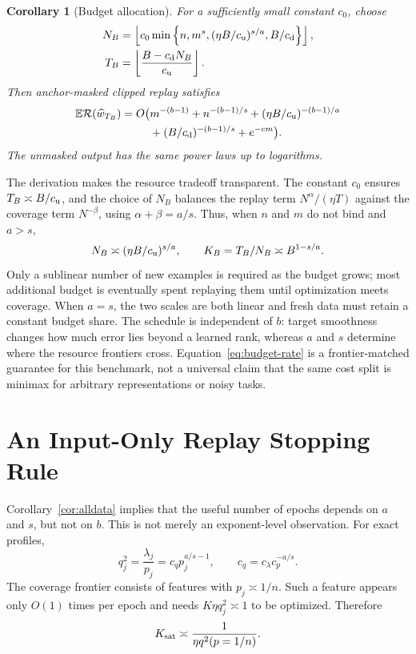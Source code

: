 \documentclass[letterpaper]{article}
\newtheorem{corollary}[theorem]{Corollary}
\newcommand{\E}{\mathbb E}
\newcommand{\R}{\mathcal R}
\begin{document}
\begin{corollary}[Budget allocation]
\label{cor:budget}
For a sufficiently small constant $c_0$, choose
\begin{align}
N_B&=\left\lfloor c_0\min\left\{
 n,m^s,(\eta B/c_{\rm u})^{s/a},B/c_{\rm d}
 \right\}\right\rfloor,\nonumber\\
T_B&=\left\lfloor\frac{B-c_{\rm d}N_B}{c_{\rm u}}\right\rfloor.
\label{eq:budget-schedule}
\end{align}
Then anchor-masked clipped replay satisfies
\begin{align}
\E\R(\widehat w_{T_B})=O\bigl(&m^{-(b-1)}+n^{-(b-1)/s}
 +(\eta B/c_{\rm u})^{-(b-1)/a}\nonumber\\
&+(B/c_{\rm d})^{-(b-1)/s}+e^{-cm}\bigr).
\label{eq:budget-rate}
\end{align}
The unmasked output has the same power laws up to logarithms.
\end{corollary}

The derivation makes the resource tradeoff transparent. The constant $c_0$
ensures $T_B\asymp B/c_{\rm u}$, and the choice of $N_B$ balances the replay
term $N^\alpha/(\eta T)$ against the coverage term $N^{-\beta}$, using
$\alpha+\beta=a/s$. Thus, when $n$ and $m$ do not bind and $a>s$,
\begin{equation}
 N_B\asymp(\eta B/c_{\rm u})^{s/a},\qquad
 K_B=T_B/N_B\asymp B^{1-s/a}.
 \label{eq:budget-interpretation}
\end{equation}
Only a sublinear number of new examples is required as the budget grows; most
additional budget is eventually spent replaying them until optimization meets
coverage. When $a=s$, the two scales are both linear and fresh data must retain
a constant budget share. The schedule is independent of $b$: target smoothness
changes how much error lies beyond a learned rank, whereas $a$ and $s$ determine
where the resource frontiers cross. Equation~\eqref{eq:budget-rate} is a
frontier-matched guarantee for this benchmark, not a universal claim that the
same cost split is minimax for arbitrary representations or noisy tasks.

\section{An Input-Only Replay Stopping Rule}

Corollary~\ref{cor:alldata} implies that the useful number of epochs depends on
$a$ and $s$, but not on $b$. This is not merely an exponent-level observation.
For exact profiles,
\begin{equation}
q_j^2=\frac{\lambda_j}{p_j}
=c_qp_j^{a/s-1},\qquad c_q=c_\lambda c_p^{-a/s}.
\label{eq:q-vs-p}
\end{equation}
The coverage frontier consists of features with $p_j\asymp1/n$. Such a feature
appears only $O(1)$ times per epoch and needs
$K\eta q_j^2\asymp1$ to be optimized. Therefore
\begin{equation}
K_{\rm sat}\asymp\frac{1}{\eta q^2(p=1/n)}.
\label{eq:ksat-input}
\end{equation}
\end{document}
